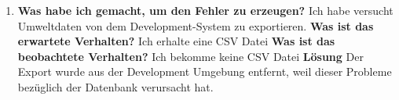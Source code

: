\begin{enumerate}
	\item \textbf{Was habe ich gemacht, um den Fehler zu erzeugen?} \newline
	Ich habe versucht Umweltdaten von dem Development-System zu exportieren. \newline
	\textbf{Was ist das erwartete Verhalten?}\newline
	Ich erhalte eine CSV Datei \newline
	\textbf{Was ist das beobachtete Verhalten?} \newline
	Ich bekomme keine CSV Datei \newline
	\textbf{Lösung} \newline
	Der Export wurde aus der Development Umgebung entfernt, weil dieser Probleme bezüglich der Datenbank verursacht hat. 
\end{enumerate}